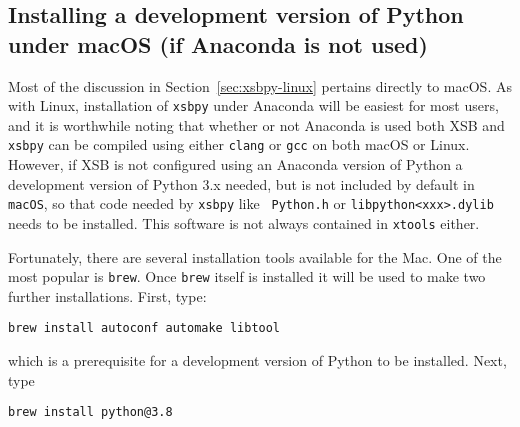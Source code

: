 
\noindent

\subsection{Installing a development version of Python under  macOS (if Anaconda is not used)}

Most of the discussion in Section~\ref{sec:xsbpy-linux} pertains
directly to macOS.  As with Linux, installation of {\tt xsbpy} under
Anaconda will be easiest for most users, and it is worthwhile noting
that whether or not Anaconda is used both XSB and {\tt xsbpy} can be
compiled using either {\tt clang} or {\tt gcc} on both macOS or Linux.
%
%
However, if XSB is not configured using an Anaconda version of Python
a development version of Python 3.x needed, but is not included by
default in {\tt macOS}, so that code needed by {\tt xsbpy} like {\tt
  Python.h} or {\tt libpython<xxx>.dylib} needs to be installed.  This
software is not always contained in {\tt xtools} either.

Fortunately, there are several installation tools available for the
Mac.  One of the most popular is {\tt brew}.  Once {\tt brew} itself
is installed it will be used to make two further installations.
First, type:

{\tt brew install autoconf automake libtool}

\noindent
which is a prerequisite for a development version of Python to be
installed.  Next, type 

{\tt brew install python@3.8}

